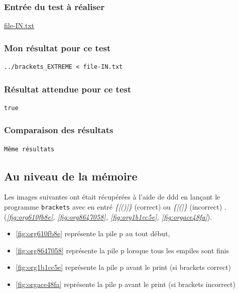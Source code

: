 \documentclass[11pt]{article}
\begin{document}
\subsubsection{Entrée du test à réaliser}
\label{sec:orgd3977fd}

\url{file-IN.txt}

\subsubsection{Mon résultat pour ce test}
\label{sec:org3896282}

\begin{verbatim}
../brackets_EXTREME < file-IN.txt
\end{verbatim}

\subsubsection{Résultat attendue pour ce test}
\label{sec:orgfd22d2f}

\label{org48bd3b1}
\begin{verbatim}
true
\end{verbatim}

\subsubsection{Comparaison des résultats}
\label{sec:org6777ff8}

\begin{verbatim}
Même résultats
\end{verbatim}

\subsection{Au niveau de la mémoire}
\label{sec:orgd6b64ec}

Les images suivantes ont était récupérées à l'aide de ddd en lançant le programme \texttt{brackets} avec en entré \emph{\{[()]\}} (correct) ou \emph{\{[(]\}} (incorrect) . (\emph{\ref{fig:org610fb8e}, \ref{fig:org8647058}, \ref{fig:org1b1cc5e}, \ref{fig:orgace48fa}}). 

\begin{itemize}
\item \ref{fig:org610fb8e} représente la pile p au tout début,
\item \ref{fig:org8647058} représente la pile p lorsque tous les empiles sont finis
\item \ref{fig:org1b1cc5e} représente la pile p avant le print (si brackets correct)
\item \ref{fig:orgace48fa} représente la pile p avant le print (si brackets incorrect)
\end{itemize}
\end{document}
